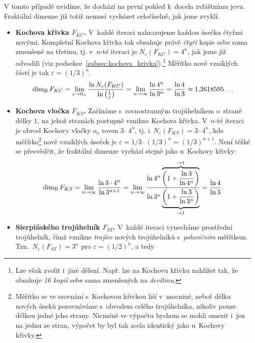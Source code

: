 V tomto případě uvidíme, že dochází na první pohled k~docela zvláštnímu jevu. Fraktální dimenze již totiž nemusí vycházet celočíselně, jak jsme zvyklí.
\begin{itemize}
    \item \textbf{Kochova křivka $F_{KC}$.} V~každé iteraci nahrazujeme každou úsečku čtyřmi novými. Kompletní Kochova křivka tak obsahuje právě \emph{čtyři} kopie sebe sama zmenšené na třetinu, tj. v~$n$-té iteraci je $N_\varepsilon(F_{KC})=4^n$, jak jsme již odvodili (viz podsekce~\ref{subsec:kochova_krivka}).\footnote{Lze však zvolit i~jiné dělení. Např. lze na Kochovu křivku nahlížet tak, že obsahuje \emph{16 kopií} sebe sama zmenšených na \emph{devítinu}.} Měřítko nově vzniklých částí je tak $\varepsilon=(1/3)^n$.
    \begin{equation}\label{eq:kochova-krivka-dimenze}
        \operatorname{dim_B}{F_{KC}}=\lim_{\varepsilon\to 0_+}{\dfrac{\ln{N_\varepsilon(F_{KC})}}{\ln{\left(\frac{1}{\varepsilon}\right)}}}=\lim_{n\to\infty}{\dfrac{\ln{4^n}}{\ln{3^n}}}=\dfrac{\ln{4}}{\ln{3}}\approx 1{,}2618595\dots
    \end{equation}
    \item \textbf{Kochova vločka $F_{KS}$.} Začínáme s~rovnostranným trojúhelníkem o~straně délky $1$, na jehož stranách postupně vznikne Kochova křivka. V~$n$-té iteraci je obvod Kochovy vločky $o_n$ roven $3\cdot 4^n$, tj. i~$N_\varepsilon(F_{KS})=3\cdot 4^n$, kde měřítko\footnote{Měřítko se ve srovnání s~Kochovou křivkou liší v~mocnině, neboť délku nových úseků porovnáváme s~obvodem celého trojúhelníka, nikoliv pouze délkou jedné jeho strany. Nicméně ve výpočtu bychom se mohli omezit i~jen na jednu ze stran, výpočet by byl tak zcela identický jako u~Kochovy křivky.} nově vzniklých úseček je $\varepsilon=1/3\cdot(1/3)^n=(1/3)^{n+1}$. Není těžké se přesvědčit, že fraktální dimenze vychází stejně jako u~Kochovy křivky:
    \begin{equation}\label{eq:kochova-vlocka-dimenze}
        \operatorname{dim_B}{F_{KS}}=\lim_{n\to\infty}{\dfrac{\ln{3\cdot 4^n}}{\ln{3^{n+1}}}}=\lim_{n\to\infty}{\dfrac{\ln{4^n}\overbrace{\left(1+\frac{\ln{3}}{\ln{4^n}}\right)}^{\to 1}}{\ln{3^n}\underbrace{\left(1+\frac{\ln{3}}{\ln{3^n}}\right)}_{\to 1}}}=\dfrac{\ln{4}}{\ln{3}}.
    \end{equation}
    \item \textbf{Sierpińského trojúhelník $F_{ST}$.} V~každé iteraci vynecháme prostřední trojúhelník, čímž vznikne \emph{trojice} nových trojúhelníků s~\emph{polovičním} měřítkem. Tzn.~$N_\varepsilon(F_{ST})=3^n$ pro $\varepsilon=(1/2)^n$, a tedy

\end{itemize}
